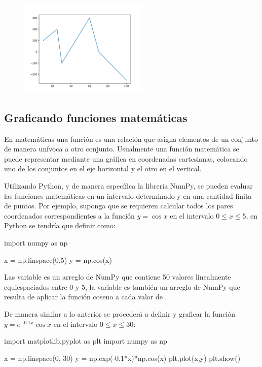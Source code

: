 \begin{figure}[h!]
\centering
\includegraphics[width=0.55\textwidth]{img/ch03/plot_two_argument.pdf}
\label{fig:plot_two_argument}
\end{figure}


\subsection{Graficando funciones matemáticas}

En matemáticas una función es una relación que asigna elementos de un conjunto de manera 
unívoca a otro conjunto. Usualmente una función matemática se puede representar 
mediante una gráfica en coordenadas cartesianas, colocando uno de los conjuntos en el 
eje horizontal y el otro en el vertical.

Utilizando Python, y de manera específica la librería NumPy, se pueden evaluar las funciones 
matemáticas en un intervalo determinado y en una cantidad finita de puntos. 
Por ejemplo, suponga que se requieren calcular todos los pares coordenados correspondientes 
a la función $ y = \cos x $ en el intervalo $ 0 \leq x \leq 5 $, en Python se tendría que definir 
como:

\begin{python}
import numpy as np

x = np.linspace(0,5)
y = np.cos(x)
\end{python}

Las variable  es un arreglo de NumPy que contiene 50 valores linealmente equiespaciados entre 
0 y 5, la variable  es también un arreglo de NumPy que resulta de aplicar la función coseno 
a cada valor de .

De manera similar a lo anterior se procederá a definir y graficar la función 
$y = e^{-0.1x} \cos x $ en el intervalo $ 0 \leq x \leq 30 $:

\begin{python}
import matplotlib.pyplot as plt
import numpy as np

x = np.linspace(0, 30)
y = np.exp(-0.1*x)*np.cos(x)
plt.plot(x,y)
plt.show()
\end{python}


